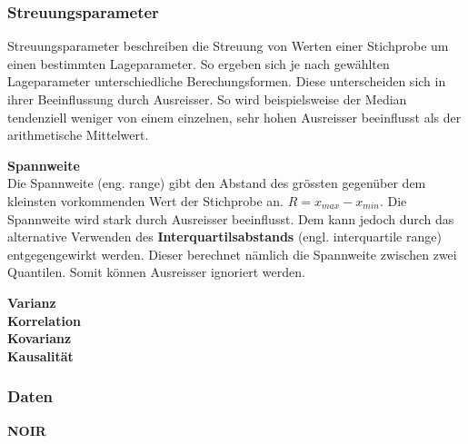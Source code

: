 \begin{flushleft}
\subsubsection{Streuungsparameter}
Streuungsparameter beschreiben die Streuung von Werten einer Stichprobe um einen bestimmten Lageparameter. So ergeben sich je nach gewählten Lageparameter unterschiedliche Berechungsformen. Diese unterscheiden sich in ihrer Beeinflussung durch Ausreisser. So wird beispielsweise der Median tendenziell weniger von einem einzelnen, sehr hohen Ausreisser beeinflusst als der arithmetische Mittelwert.
\linebreak

\textbf{Spannweite} \\
Die Spannweite (eng. range) gibt den Abstand des grössten gegenüber dem kleinsten vorkommenden Wert der Stichprobe an. $R = x_{max} - x_{min}$.
\linebreak
Die Spannweite wird stark durch Ausreisser beeinflusst. Dem kann jedoch durch das alternative Verwenden des \textbf{Interquartilsabstands} (engl. interquartile range) entgegengewirkt werden. Dieser berechnet nämlich die Spannweite zwischen zwei Quantilen. Somit können Ausreisser ignoriert werden.
\linebreak

\textbf{Varianz} \\



\textbf{Korrelation} \\


\textbf{Kovarianz} \\



\textbf{Kausalität} \\

\subsubsection{Daten}
\textbf{NOIR} \\


\end{flushleft}
